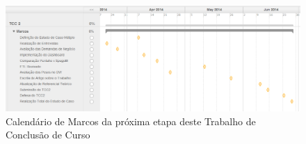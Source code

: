 \begin{figure}[ht!]
\centering
\includegraphics[keepaspectratio=false,scale=0.3]{figuras/marcostcc2.eps}
\caption{Calendário de Marcos da próxima etapa deste Trabalho de Conclusão de Curso}
\label{calendar}
\end{figure}
\FloatBarrier